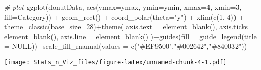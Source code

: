 \documentclass[
]{article}
\newenvironment{Shaded}{\begin{snugshade}}{\end{snugshade}}
\newcommand{\AttributeTok}[1]{\textcolor[rgb]{0.77,0.63,0.00}{#1}}
\newcommand{\CommentTok}[1]{\textcolor[rgb]{0.56,0.35,0.01}{\textit{#1}}}
\newcommand{\ConstantTok}[1]{\textcolor[rgb]{0.00,0.00,0.00}{#1}}
\newcommand{\DecValTok}[1]{\textcolor[rgb]{0.00,0.00,0.81}{#1}}
\newcommand{\FunctionTok}[1]{\textcolor[rgb]{0.00,0.00,0.00}{#1}}
\newcommand{\NormalTok}[1]{#1}
\newcommand{\SpecialCharTok}[1]{\textcolor[rgb]{0.00,0.00,0.00}{#1}}
\newcommand{\StringTok}[1]{\textcolor[rgb]{0.31,0.60,0.02}{#1}}
\begin{document}
\begin{Shaded}
\begin{Highlighting}[]
\CommentTok{\# plot}
\FunctionTok{ggplot}\NormalTok{(donutData, }\FunctionTok{aes}\NormalTok{(}\AttributeTok{ymax=}\NormalTok{ymax, }\AttributeTok{ymin=}\NormalTok{ymin, }\AttributeTok{xmax=}\DecValTok{4}\NormalTok{, }\AttributeTok{xmin=}\DecValTok{3}\NormalTok{, }\AttributeTok{fill=}\NormalTok{Category)) }\SpecialCharTok{+}
     \FunctionTok{geom\_rect}\NormalTok{() }\SpecialCharTok{+}
     \FunctionTok{coord\_polar}\NormalTok{(}\AttributeTok{theta=}\StringTok{"y"}\NormalTok{) }\SpecialCharTok{+} 
     \FunctionTok{xlim}\NormalTok{(}\FunctionTok{c}\NormalTok{(}\DecValTok{1}\NormalTok{, }\DecValTok{4}\NormalTok{)) }\SpecialCharTok{+} \FunctionTok{theme\_classic}\NormalTok{(}\AttributeTok{base\_size=}\DecValTok{28}\NormalTok{)}\SpecialCharTok{+}\FunctionTok{theme}\NormalTok{(}
    \AttributeTok{axis.text =} \FunctionTok{element\_blank}\NormalTok{(),}
    \AttributeTok{axis.ticks =} \FunctionTok{element\_blank}\NormalTok{(),}
    \AttributeTok{axis.line =} \FunctionTok{element\_blank}\NormalTok{()}
\NormalTok{  )}\SpecialCharTok{+}\FunctionTok{guides}\NormalTok{(}\AttributeTok{fill =} \FunctionTok{guide\_legend}\NormalTok{(}\AttributeTok{title =} \ConstantTok{NULL}\NormalTok{))}\SpecialCharTok{+}\FunctionTok{scale\_fill\_manual}\NormalTok{(}\AttributeTok{values =} \FunctionTok{c}\NormalTok{(}\StringTok{"\#EF9500"}\NormalTok{,}\StringTok{"\#002642"}\NormalTok{,}\StringTok{"\#840032"}\NormalTok{))}
\end{Highlighting}
\end{Shaded}

\texttt{[image: Stats\_n\_Viz\_files/figure-latex/unnamed-chunk-4-1.pdf]}
\end{document}
